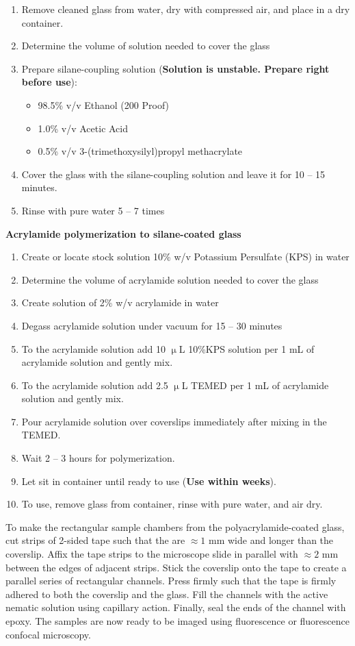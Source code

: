 \begin{enumerate}
  \item Remove cleaned glass from water, dry with compressed air, and place in a dry container.
  \item Determine the volume of solution needed to cover the glass
  \item Prepare silane-coupling solution ({\bf Solution is unstable. Prepare right before use}):
  \begin{itemize}
    \item 98.5\% v/v Ethanol (200 Proof)
    \item 1.0\% v/v Acetic Acid
    \item 0.5\% v/v 3-(trimethoxysilyl)propyl methacrylate
  \end{itemize}
  \item Cover the glass with the silane-coupling solution and leave it for 10 -- 15 minutes.
  \item Rinse with pure water 5 -- 7 times
\end{enumerate}
{\bf Acrylamide polymerization to silane-coated glass}
\begin{enumerate}
  \item Create or locate stock solution 10\% w/v Potassium Persulfate (KPS) in water
  \item Determine the volume of acrylamide solution needed to cover the glass
  \item Create solution of 2\% w/v acrylamide in water
  \item Degass acrylamide solution under vacuum for 15 -- 30 minutes
  \item To the acrylamide solution add 10 $\upmu$L 10\%KPS solution per 1 mL of acrylamide solution and gently mix.
  \item To the acrylamide solution add 2.5 $\upmu$L TEMED per 1 mL of acrylamide solution and gently mix.
  \item Pour acrylamide solution over coverslips immediately after mixing in the TEMED.
  \item Wait 2 -- 3 hours for polymerization.
  \item Let sit in container until ready to use ({\bf Use within weeks}).
  \item To use, remove glass from container, rinse with pure water, and air dry.
\end{enumerate}

To make the rectangular sample chambers from the polyacrylamide-coated glass, cut strips of 2-sided tape such that the are $\approx1$ mm wide and longer than the coverslip.
Affix the tape strips to the microscope slide in parallel with $\approx 2$ mm between the edges of adjacent strips.
Stick the coverslip onto the tape to create a parallel series of rectangular channels.
Press firmly such that the tape is firmly adhered to both the coverslip and the glass.
Fill the channels with the active nematic solution using capillary action.
Finally, seal the ends of the channel with epoxy.
The samples are now ready to be imaged using fluorescence or fluorescence confocal microscopy. \\


